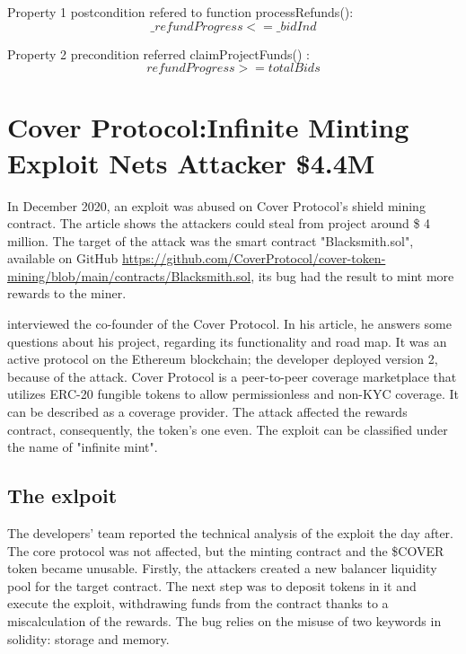 Property 1 postcondition refered to function processRefunds():
\begin{equation}
      \_refundProgress<=\_bidInd
\end{equation}

Property 2 precondition referred claimProjectFunds() : 
\begin{equation}
    refundProgress >= totalBids
\end{equation}

\section{Cover Protocol:Infinite Minting Exploit Nets Attacker \$4.4M }
\label{sec:Exploits:CoverProtocol}
In December 2020, an exploit was abused on Cover Protocol's shield 
mining contract. 
The article shows the attackers could steal from project around \$ 4 million. 
The target of the attack was the smart contract "Blacksmith.sol", available on GitHub \url{https://github.com/CoverProtocol/cover-token-mining/blob/main/contracts/Blacksmith.sol}, its bug had the result to mint more rewards to the miner. 

\citet{CoverProtocol} interviewed the co-founder of the Cover Protocol. In his article, he answers some questions about his project, regarding its functionality and road map. 
It was an active protocol on the Ethereum blockchain; the developer deployed version 2,  because of the attack. 
Cover Protocol is a peer-to-peer coverage marketplace that utilizes ERC-20 fungible tokens to allow permissionless and non-KYC coverage. 
It can be described as a coverage provider.
The attack affected the rewards contract, consequently, the token's one even.  
The exploit can be classified under the name of "infinite mint".

\subsection{The exlpoit}
\label{sec:CoverProtocol:Exploit}
The developers' team reported \citep{CoverProtocolPostMortem} the technical analysis of the exploit the day after.
The core protocol was not affected, 
but the minting contract and the \$COVER token became unusable.
Firstly, the attackers created a new balancer liquidity pool for the target contract. The next step was to deposit tokens in it and execute the exploit, 
withdrawing funds from the contract thanks to a miscalculation of the rewards.
The bug relies on the misuse of two keywords in solidity: storage and memory. 

